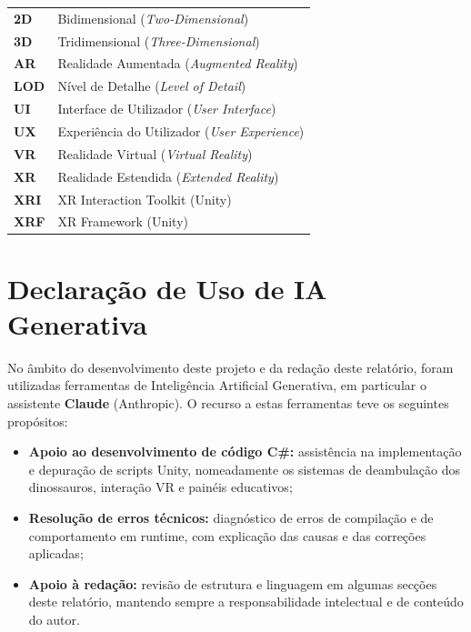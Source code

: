 \documentclass[a4paper,11pt]{report}
\newcommand{\blankpage}{%
    \newpage
    \thispagestyle{empty}
    \mbox{}
    \newpage
}
\begin{document}
\begin{tabular}{@{}lp{10cm}@{}}
\textbf{2D}  & Bidimensional (\textit{Two-Dimensional}) \\[4pt]
\textbf{3D}  & Tridimensional (\textit{Three-Dimensional}) \\[4pt]
\textbf{AR}  & Realidade Aumentada (\textit{Augmented Reality}) \\[4pt]
\textbf{LOD} & Nível de Detalhe (\textit{Level of Detail}) \\[4pt]
\textbf{UI}  & Interface de Utilizador (\textit{User Interface}) \\[4pt]
\textbf{UX}  & Experiência do Utilizador (\textit{User Experience}) \\[4pt]
\textbf{VR}  & Realidade Virtual (\textit{Virtual Reality}) \\[4pt]
\textbf{XR}  & Realidade Estendida (\textit{Extended Reality}) \\[4pt]
\textbf{XRI} & XR Interaction Toolkit (Unity) \\[4pt]
\textbf{XRF} & XR Framework (Unity) \\[4pt]
\end{tabular}

\blankpage

\chapter*{Declaração de Uso de IA Generativa}

No âmbito do desenvolvimento deste projeto e da redação deste relatório,
foram utilizadas ferramentas de Inteligência Artificial Generativa, em
particular o assistente \textbf{Claude} (Anthropic). O recurso a estas
ferramentas teve os seguintes propósitos:

\begin{itemize}
    \setlength\itemsep{0pt}
    \item \textbf{Apoio ao desenvolvimento de código C\#:} assistência na
          implementação e depuração de scripts Unity, nomeadamente os sistemas
          de deambulação dos dinossauros, interação VR e painéis educativos;
    \item \textbf{Resolução de erros técnicos:} diagnóstico de erros de
          compilação e de comportamento em runtime, com explicação das causas
          e das correções aplicadas;
    \item \textbf{Apoio à redação:} revisão de estrutura e linguagem em
          algumas secções deste relatório, mantendo sempre a responsabilidade
          intelectual e de conteúdo do autor.
\end{itemize}
\end{document}
